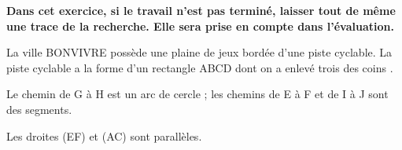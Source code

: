 \documentclass[10pt]{article}
\begin{document}
\setlength\parindent{0mm}
\pagestyle{fancy}
\thispagestyle{empty}
    
    
    




\medskip

\textbf{Dans cet exercice, si le travail n'est pas terminé, laisser tout de même une trace de la recherche. Elle sera prise en compte dans l'évaluation.}

\medskip
 
La ville BONVIVRE possède une plaine de jeux bordée d'une piste cyclable. La piste cyclable a la forme d'un rectangle ABCD dont on a \og enlevé trois des coins \fg.
 
Le chemin de G à H est un arc de cercle ; les chemins de E à F et de I à J sont des segments.
 
Les droites (EF) et (AC) sont parallèles. 
\end{document}
